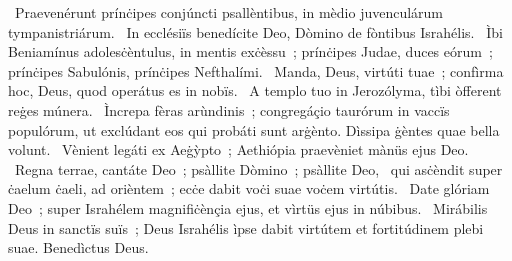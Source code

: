 {~Praevenérunt prínċipes conjúncti psallèntibus, in mèdio juvenculárum tympanistriárum. 
~In ecclésiïs benedícite Deo, Dòmino de fòntibus Israhélis. 
~Ìbi Beniamínus adolesċèntulus, in mentis exċèssu~; prínċipes Judae, duces eórum~; prínċipes Sabulónis, prínċipes Nefthalími. 
~Manda, Deus, virtúti tuae~; confìrma hoc, Deus, quod operátus es in nobïs. 
~A templo tuo in Jerozólyma, tìbi òfferent reġes múnera. 
~Ìncrepa fèras arùndinis~; congregáçio taurórum in vaccïs populórum, ut exclúdant eos qui probáti sunt arġènto. Dìssipa ġèntes quae bella volunt. 
~Vènient legáti ex Aeġỳpto~; Aethiópia praevèniet mànüs ejus Deo. 
~Regna terrae, cantáte Deo~; psàllite Dòmino~; psàllite Deo, 
~qui asċèndit super ċaelum ċaeli, ad orièntem~; ecċe dabit voċi suae voċem virtútis. 
~Date glóriam Deo~; super Israhélem magnifiċènçia ejus, et vìrtüs ejus in núbibus. 
~Mirábilis Deus in sanctïs suïs~; Deus Israhélis ìpse dabit virtútem et fortitúdinem plebi suae. Benedìctus Deus. 
}

